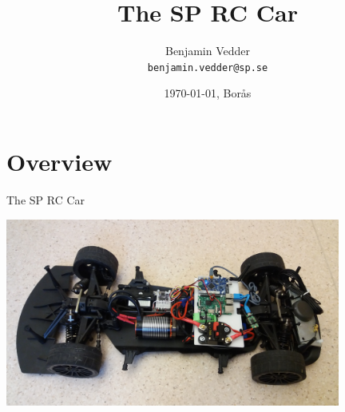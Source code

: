 \documentclass[aspectratio=169,electronics,notopline]{beamer}
\title{The SP RC Car}
\author[Euclid]{Benjamin Vedder\\
\texttt{benjamin.vedder@sp.se}}
\date{\today, Borås}
\begin{document}
\spStartFrame
\maketitle


\section{Overview}

\begin{frame}{The SP RC Car}
\begin{center}
	\includegraphics[width=11cm]{Figures/car.jpg}
\end{center}
\end{frame}
\end{document}

